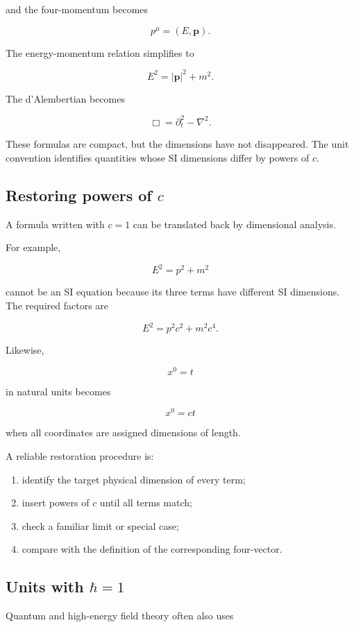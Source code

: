 and the four-momentum becomes

\[
p^{\mu}=(E,\mathbf{p}).
\]

The energy-momentum relation simplifies to

\[
\boxed{
E^{2}=|\mathbf{p}|^{2}+m^{2}
}.
\]

The d'Alembertian becomes

\[
\boxed{
\Box=\partial_{t}^{2}-\nabla^{2}
}.
\]

These formulas are compact, but the dimensions have not disappeared. The unit convention identifies quantities whose SI dimensions differ by powers of \(c\).

\subsection{Restoring powers of \(c\)}

A formula written with \(c=1\) can be translated back by dimensional analysis.

For example,

\[
E^{2}=p^{2}+m^{2}
\]

cannot be an SI equation because its three terms have different SI dimensions. The required factors are

\[
E^{2}
=
p^{2}c^{2}
+
m^{2}c^{4}.
\]

Likewise,

\[
x^{0}=t
\]

in natural units becomes

\[
x^{0}=ct
\]

when all coordinates are assigned dimensions of length.

A reliable restoration procedure is:

\begin{enumerate}
    \item identify the target physical dimension of every term;
    \item insert powers of \(c\) until all terms match;
    \item check a familiar limit or special case;
    \item compare with the definition of the corresponding four-vector.
\end{enumerate}

\subsection{Units with \(\hbar=1\)}

Quantum and high-energy field theory often also uses

